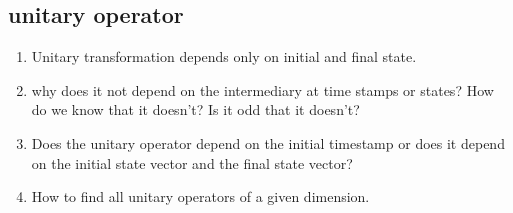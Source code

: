 \documentclass{article}
\begin{document}
    \subsection{unitary operator}
    \begin{enumerate}    
    \item Unitary transformation depends only on initial and final state.
    \item why does it not depend on the intermediary at time stamps or states? How do we know that it doesn't? Is it odd that it doesn't?

    \item Does the unitary operator depend on the initial timestamp or does it depend on the initial state vector and the final state vector?
    
    \item How to find all unitary operators of a given dimension.
    \end{enumerate}
\end{document}

